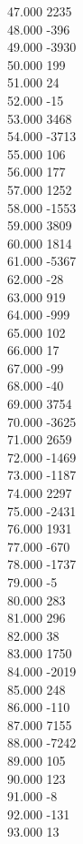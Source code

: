 { 47.000	2235 \\
 48.000	-396 \\
 49.000	-3930 \\
 50.000	199 \\
 51.000	24 \\
 52.000	-15 \\
 53.000	3468 \\
 54.000	-3713 \\
 55.000	106 \\
 56.000	177 \\
 57.000	1252 \\
 58.000	-1553 \\
 59.000	3809 \\
 60.000	1814 \\
 61.000	-5367 \\
 62.000	-28 \\
 63.000	919 \\
 64.000	-999 \\
 65.000	102 \\
 66.000	17 \\
 67.000	-99 \\
 68.000	-40 \\
 69.000	3754 \\
 70.000	-3625 \\
 71.000	2659 \\
 72.000	-1469 \\
 73.000	-1187 \\
 74.000	2297 \\
 75.000	-2431 \\
 76.000	1931 \\
 77.000	-670 \\
 78.000	-1737 \\
 79.000	-5 \\
 80.000	283 \\
 81.000	296 \\
 82.000	38 \\
 83.000	1750 \\
 84.000	-2019 \\
 85.000	248 \\
 86.000	-110 \\
 87.000	7155 \\
 88.000	-7242 \\
 89.000	105 \\
 90.000	123 \\
 91.000	-8 \\
 92.000	-131 \\
 93.000	13 \\
}

